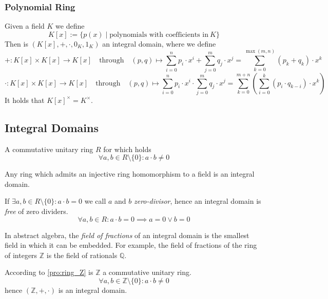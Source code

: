 \subsubsection{Polynomial Ring}
\begin{example}
   Given a field \(K\) we define
   \[K[x] := \{p(x) \mid \text{polynomials with coefficients in}~K\}\]
   Then is \((K[x], +, \cdot, 0_K, 1_K)\) an integral domain, where we define
   \[+: K[x] \times K[x] \to K[x] \quad\text{through}\quad (p, q) \mapsto \sum_{i=0}^n p_i \cdot x^i + \sum_{j=0}^m q_j \cdot x^j = \sum_{k=0}^{\max(m,n)} (p_k + q_k) \cdot x^k\]
   \[\cdot: K[x] \times K[x] \to K[x] \quad\text{through}\quad (p, q) \mapsto \sum_{i=0}^n p_i \cdot x^i \cdot \sum_{j=0}^m q_j \cdot x^j = \sum_{k=0}^{m+n} \left(\sum_{i=0}^k (p_i \cdot q_{k-i}) \cdot x^k\right)\]
   It holds that \(K[x]^{\times} = K^{\times}\).
\end{example}

\subsection{Integral Domains}
\begin{definition}\label{def:integral_domain}
   A commutative unitary ring \(R\) for which holds
   \[\forall a, b \in R \setminus \{0\}: a \cdot b \neq 0\]
\end{definition}
\begin{remark}
   Any ring which admits an injective ring homomorphism to a field is an integral domain.
\end{remark}
\begin{remark}
   If \(\exists a, b \in R \setminus \{0\}: a \cdot b = 0\) we call \(a\) and \(b\) \emph{zero-divisor}, hence an integral domain is \emph{free} of zero dividers.
   \[\forall a, b \in R: a \cdot b = 0 \implies a = 0 \lor b = 0\]
\end{remark}
\begin{remark}
   In abstract algebra, the \emph{field of fractions} of an integral domain is the smallest field in which it can be embedded.
   For example, the field of fractions of the ring of integers \(\mathbb{Z}\) is the field of rationals \(\mathbb{Q}\).
\end{remark}
\begin{example}
   According to \cref{pro:ring_Z} is \(\mathbb{Z}\) a commutative unitary ring.
   \[\forall a, b \in \mathbb{Z} \setminus \{0\}: a \cdot b \neq 0\]
   hence \((\mathbb{Z}, +, \cdot)\) is an integral domain.
\end{example}

